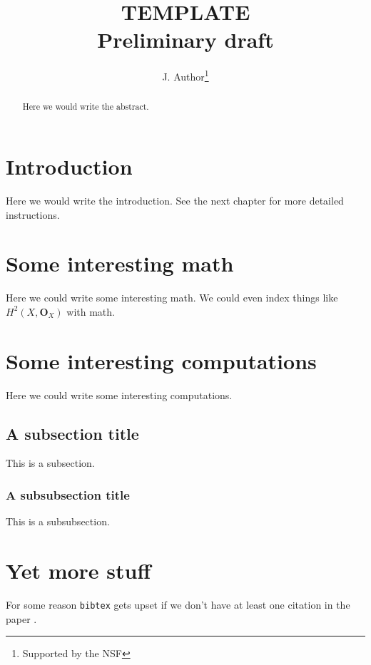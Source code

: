 \title{TEMPLATE\\Preliminary draft}
\author{J. Author\thanks{Supported by the NSF}}
\maketitle

\begin{abstract}
Here we would write the abstract.
\end{abstract}

\section*{Introduction}
Here we would write the introduction.  See the next chapter for more detailed instructions.

\section{Some interesting math}
Here we could write some interesting math.  We could even index things like
$H^2(X,\mathbf O_X)$ with math.

\section{Some interesting computations}
Here we could write some interesting computations.

\subsection{A subsection title}  This is a subsection.

\subsubsection{A subsubsection title}  This is a subsubsection.

\section{Yet more stuff}
For some reason {\tt bibtex} gets upset if we don't have at least one
citation in the paper \cite{MR47:3318}.

